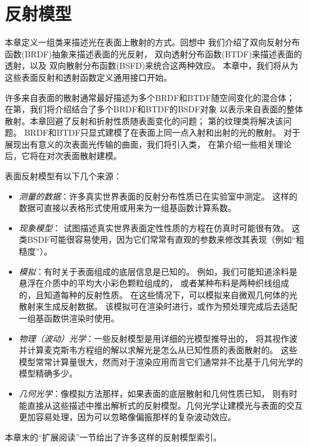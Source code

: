 \chapter{反射模型}\label{chap:反射模型}
\setcounter{sidenote}{1}
本章定义一组类来描述光在表面上散射的方式。回想中
我们介绍了双向反射分布函数(BRDF)抽象来描述表面的光反射，
双向透射分布函数(BTDF)来描述表面的透射，以及
双向散射分布函数(BSFD)来统合这两种效应。
本章中，我们将从为这些表面反射和透射函数定义通用接口开始。

许多来自表面的散射通常最好描述为多个BRDF和BTDF随空间变化的混合体；
在第，我们将介绍结合了多个BRDF和BTDF的BSDF对象
以表示来自表面的整体散射。本章回避了反射和折射性质随表面变化的问题；
第的纹理类将解决该问题。
BRDF和BTDF只显式建模了在表面上同一点入射和出射的光的散射。
对于展现出有意义的次表面光传输的曲面，我们将引入类，
在第介绍一些相关理论后，它将在对次表面散射建模。

表面反射模型有以下几个来源：
\begin{itemize}
      \item \emph{测量的数据}：许多真实世界表面的反射分布性质已在实验室中测定。
            这样的数据可直接以表格形式使用或用来为一组基函数计算系数。
      \item \emph{现象模型}：
            试图描述真实世界表面定性性质的方程在仿真时可能很有效。
            这类BSDF可能很容易使用，因为它们常常有直观的参数来修改其表现（例如“粗糙度”）。
      \item \emph{模拟}：有时关于表面组成的底层信息是已知的。
            例如，我们可能知道涂料是悬浮在介质中的平均大小彩色颗粒组成的，
            或者某种布料是两种织线组成的，且知道每种的反射性质。
            在这些情况下，可以模拟来自微观几何体的光散射来生成反射数据。
            该模拟可在渲染时进行，或作为预处理完成后去适配一组基函数供渲染时使用。
      \item \emph{物理（波动）光学}：一些反射模型是用详细的光模型推导出的，
            将其视作波并计算麦克斯韦方程组的解以求解光是怎么从已知性质的表面散射的。
            这些模型常常计算量很大，然而对于渲染应用而言它们通常并不比基于几何光学的模型精确多少。
      \item \emph{几何光学}：像模拟方法那样，如果表面的底层散射和几何性质已知，
            则有时能直接从这些描述中推出解析式的反射模型。几何光学让建模光与表面的交互
            更加容易处理，因为可以忽略像偏振那样的复杂波动效应。
\end{itemize}
本章末的“扩展阅读”一节给出了许多这样的反射模型索引。

